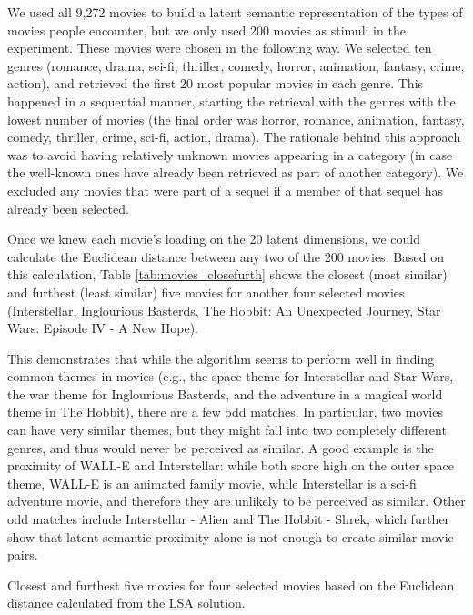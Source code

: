 \documentclass[11pt,a4paper]{article}
\begin{document}


We used all 9,272 movies to build a latent semantic representation of the types of movies people encounter, but we only used 200 movies as stimuli in the experiment. These movies were chosen in the following way. We selected ten genres (romance, drama, sci-fi, thriller, comedy, horror, animation, fantasy, crime, action), and retrieved the first 20 most popular movies in each genre. This happened in a sequential manner, starting the retrieval with the genres with the lowest number of movies (the final order was horror, romance, animation, fantasy, comedy, thriller, crime, sci-fi, action, drama). The rationale behind this approach was to avoid having relatively unknown movies appearing in a category (in case the well-known ones have already been retrieved as part of another category). We excluded any movies that were part of a sequel if a member of that sequel has already been selected.




Once we knew each movie's loading on the 20 latent dimensions, we could calculate the Euclidean distance between any two of the 200 movies. Based on this calculation, Table \ref{tab:movies_closefurth} shows the closest (most similar) and furthest (least similar) five movies for another four selected movies (Interstellar, Inglourious Basterds, The Hobbit: An Unexpected Journey, Star Wars: Episode IV - A New Hope). 


This demonstrates that while the algorithm seems to perform well in finding common themes in movies (e.g., the space theme for Interstellar and Star Wars, the war theme for Inglourious Basterds, and the adventure in a magical world theme in The Hobbit), there are a few odd matches. In particular, two movies can have very similar themes, but they might fall into  two completely different genres, and thus would never be perceived as similar. A good example is the proximity of WALL-E and Interstellar: while both score high on the outer space theme, WALL-E is an animated family movie, while Interstellar is a sci-fi adventure movie, and therefore they are unlikely to be perceived as similar. Other odd matches include Interstellar - Alien and The Hobbit - Shrek, which further show that latent semantic proximity alone is not enough to create similar movie pairs.

\begin{table}[H]
\captionsetup{justification=centering}
\caption {Closest and furthest five movies for four selected movies based on the Euclidean distance calculated from the LSA solution.} \label{tab:movies_closefurth} 

\end{table}
\end{document}
